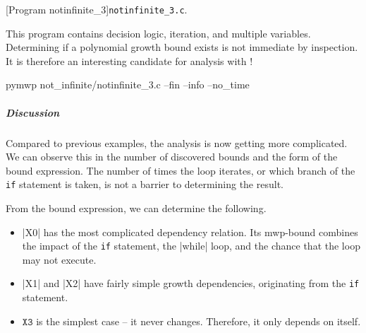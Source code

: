 \begin{center}
\begin{minipage}{\textwidth}
\captionsetup{type=lstlisting}
[Program notinfinite\_3]{\texttt{notinfinite\_3.c}.}
\label{lst:notinfinite3}
\end{minipage}
\end{center}

This program contains decision logic, iteration, and multiple variables.
Determining if a polynomial growth bound exists is not immediate by inspection.
It is therefore an interesting candidate for analysis with !

\begin{center}
\begin{minipage}{\textwidth}
\captionsetup{type=lstlisting}
\begin{cmdlisting}[label={lst:ex3-run-cmd}]
pymwp not_infinite/notinfinite_3.c --fin --info --no_time
\end{cmdlisting}
\end{minipage}
\end{center}

\begin{center}
\begin{minipage}{\textwidth}
\end{minipage}
\label{lst:ex3-output}
\end{center}

\subparagraph*{Discussion}\label{discussion}

Compared to previous examples, the analysis is now getting more complicated. We
can observe this in the number of discovered bounds and the form of the bound
expression. The number of times the loop iterates, or which branch of the
\texttt{if} statement is taken, is not a barrier to determining the result.

From the bound expression, we can determine the following.

\begin{itemize}
\item \pr|X0| has the most complicated dependency relation. Its
mwp-bound combines the impact of the \texttt{if} statement, the
\pr|while| loop, and the chance that the loop may not execute.

\item \pr|X1| and \pr|X2| have fairly simple growth dependencies, originating
from the \texttt{if} statement.

\item \(\texttt{X3}\) is the simplest case -- it never changes. Therefore, it
only depends on itself.
\end{itemize}

